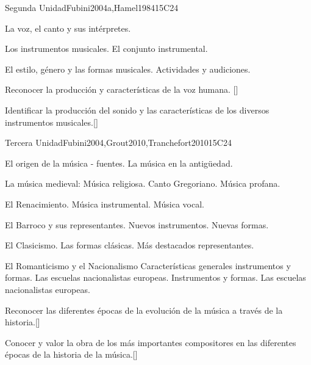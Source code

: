\begin{syllabus}
\begin{unit}{}{Segunda Unidad}{Fubini2004a,Hamel1984}{15}{C24}
\begin{topics}
	\item La voz, el canto y sus intérpretes. 
	\item Los instrumentos musicales. 
		\subitem El conjunto instrumental.
	\item El estilo, género y las formas musicales. Actividades y audiciones.
\end{topics}
\begin{learningoutcomes}
	\item Reconocer la producción y características de la voz humana. [\Usage]
	\item Identificar la producción del sonido y las características de los diversos instrumentos musicales.[\Usage]
\end{learningoutcomes}
\end{unit}

\begin{unit}{}{Tercera Unidad}{Fubini2004,Grout2010,Tranchefort2010}{15}{C24}
\begin{topics}
	\item El origen de la música - fuentes. 
		\subitem La música en la antigüedad.
	\item La música medieval: Música religiosa.  
		\subitem Canto Gregoriano. 
		\subitem Música profana.
	\item El Renacimiento.
		\subitem Música instrumental.
		\subitem Música vocal.
	\item El Barroco y sus representantes. 
		\subitem Nuevos instrumentos.
		\subitem Nuevas formas.
	\item El Clasicismo.
		\subitem Las formas clásicas.
		\subitem Más destacados representantes.
	\item El Romanticismo y el Nacionalismo
		\subitem Características generales instrumentos y formas. 
		\subitem Las escuelas nacionalistas europeas.
		\subitem Instrumentos y formas. 
		\subitem Las escuelas nacionalistas europeas.
\end{topics}
\begin{learningoutcomes}
	\item Reconocer  las diferentes épocas de la evolución de la música a través de la historia.[\Usage]
	\item Conocer y valor la obra de los más importantes compositores en las diferentes épocas de la historia de la música.[\Usage]
\end{learningoutcomes}
\end{unit}


\end{syllabus}
